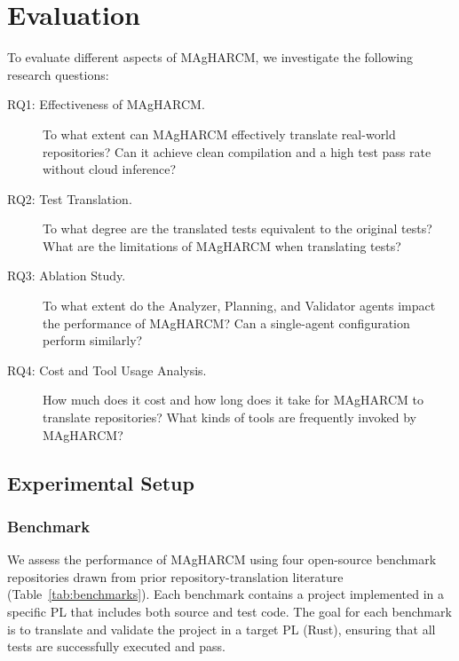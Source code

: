 \section{Evaluation}
\label{sec:eval}

To evaluate different aspects of MAgHARCM, we investigate the following
research questions:

\begin{description}
    \item[RQ1: Effectiveness of MAgHARCM.] To what extent can
    MAgHARCM effectively translate real-world repositories? Can it
    achieve clean compilation and a high test pass rate without cloud
    inference?
    \item[RQ2: Test Translation.] To what degree are the translated
    tests equivalent to the original tests? What are the limitations
    of MAgHARCM when translating tests?
    \item[RQ3: Ablation Study.] To what extent do the Analyzer,
    Planning, and Validator agents impact the performance of MAgHARCM?
    Can a single-agent configuration perform similarly?
    \item[RQ4: Cost and Tool Usage Analysis.] How much does it cost
    and how long does it take for MAgHARCM to translate repositories?
    What kinds of tools are frequently invoked by MAgHARCM?
\end{description}

\subsection{Experimental Setup}
\label{sec:eval_setup}

\subsubsection{Benchmark}
\label{sec:eval_benchmarks}

We assess the performance of MAgHARCM using four open-source benchmark
repositories drawn from prior repository-translation
literature~\cite{yang2024alphatrans,siddiq2024oxidizer,p64_skel,p30_crust_bench}
(Table~\ref{tab:benchmarks}). Each benchmark contains a project
implemented in a specific PL that includes both source and test code.
The goal for each benchmark is to translate and validate the project
in a target PL (Rust), ensuring that all tests are successfully
executed and pass.

